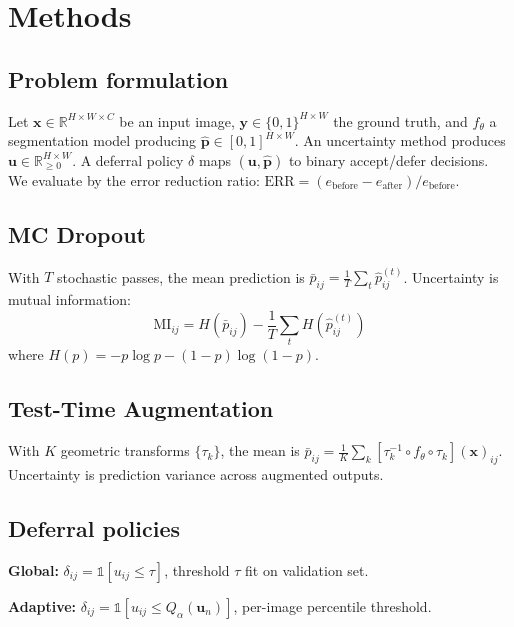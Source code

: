 \documentclass[journal]{IEEEtran}
\begin{document}
\section{Methods}

\subsection{Problem formulation}

Let $\mathbf{x} \in \mathbb{R}^{H \times W \times C}$ be an input image,
$\mathbf{y} \in \{0,1\}^{H \times W}$ the ground truth, and $f_\theta$ a
segmentation model producing $\hat{\mathbf{p}} \in [0,1]^{H \times W}$. An
uncertainty method produces $\mathbf{u} \in \mathbb{R}_{\geq 0}^{H \times W}$.
A deferral policy $\delta$ maps $(\mathbf{u}, \hat{\mathbf{p}})$ to binary
accept/defer decisions. We evaluate by the error reduction ratio:
$\text{ERR} = (e_{\text{before}} - e_{\text{after}}) / e_{\text{before}}$.

\subsection{MC Dropout}

With $T$ stochastic passes, the mean prediction is $\bar{p}_{ij} =
\frac{1}{T}\sum_t \hat{p}_{ij}^{(t)}$. Uncertainty is mutual information:
\begin{equation}
\text{MI}_{ij} = H(\bar{p}_{ij}) - \frac{1}{T}\sum_t H(\hat{p}_{ij}^{(t)})
\end{equation}
where $H(p) = -p\log p - (1-p)\log(1-p)$.

\subsection{Test-Time Augmentation}

With $K$ geometric transforms $\{\tau_k\}$, the mean is $\bar{p}_{ij} =
\frac{1}{K}\sum_k [\tau_k^{-1} \circ f_\theta \circ \tau_k](\mathbf{x})_{ij}$.
Uncertainty is prediction variance across augmented outputs.

\subsection{Deferral policies}

\textbf{Global:} $\delta_{ij} = \mathbb{1}[u_{ij} \leq \tau]$, threshold
$\tau$ fit on validation set.

\textbf{Adaptive:} $\delta_{ij} = \mathbb{1}[u_{ij} \leq Q_\alpha(\mathbf{u}_n)]$,
per-image percentile threshold.
\end{document}
